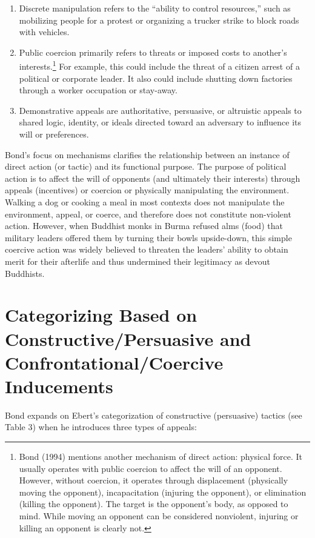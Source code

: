 \documentclass[twoside,a4paper,12pt,fleqn,openany]{extbook}
\begin{document}
\begin{enumerate}
\item Discrete manipulation refers to the “ability to control resources,” such as mobilizing
people for a protest or organizing a trucker strike to block roads with vehicles.
\item Public coercion primarily refers to threats or imposed costs to another’s interests.\footnote{Bond (1994) mentions another mechanism of direct action: physical force. It usually operates with public coercion to affect the will of an opponent. However, without coercion, it operates through displacement (physically moving the opponent), incapacitation (injuring the opponent), or elimination (killing the opponent). The target is the opponent’s body, as opposed to mind. While moving an opponent can be considered nonviolent, injuring or killing an opponent is clearly not.} For example, this could include the threat of a citizen arrest of a political or corporate leader. It also could include shutting down factories through a worker occupation or stay-away.
\item Demonstrative appeals are authoritative, persuasive, or altruistic appeals to shared logic, identity, or ideals directed toward an adversary to influence its will or preferences.
\end{enumerate}

Bond’s focus on mechanisms clarifies the relationship between an instance of direct action (or tactic) and its functional purpose. The purpose of political action is to affect the will of opponents (and ultimately their interests) through appeals (incentives) or coercion or physically manipulating the environment. Walking a dog or cooking a meal in most contexts does not manipulate the environment, appeal, or coerce, and therefore does not constitute non-violent action. However, when Buddhist monks in Burma refused alms (food) that military leaders offered them by turning their bowls upside-down, this simple coercive action was widely believed to threaten the leaders’ ability to obtain merit for their afterlife and thus undermined their legitimacy as devout Buddhists.

\section*{Categorizing Based on Constructive/Persuasive and Confrontational/Coercive Inducements}

Bond expands on Ebert’s categorization of constructive (persuasive) tactics (see Table 3) when he introduces three types of appeals:
\end{document}
